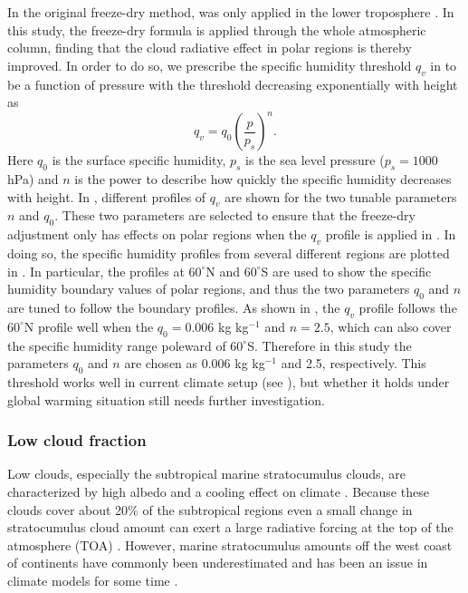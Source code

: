 In the original freeze-dry method,  was only applied in the lower troposphere \citep{Vavrus2008}. In this study, the freeze-dry formula is applied through the whole atmospheric column, finding that the cloud radiative effect in polar regions is thereby improved. In order to do so, we prescribe the specific humidity threshold $q_v$ in  to be a function of pressure with the threshold decreasing exponentially with height as
\begin{equation}
	q_{v} = q_0\left(\frac{p}{p_s}\right)^n.
	\label{eq:qv_freeze-dry}
\end{equation}
Here $q_0$ is the surface specific humidity, $p_s$ is the sea level pressure ($p_s=1000$ hPa) and $n$ is the power to describe how quickly the specific humidity decreases with height. In , different profiles of $q_v$ are shown for the two tunable parameters $n$ and $q_0$. These two parameters are selected to ensure that the freeze-dry adjustment only has effects on polar regions when the $q_v$ profile is applied in . In doing so, the specific humidity profiles from several different regions are plotted in . In particular, the profiles at $60^{\circ}$N and $60^{\circ}$S are used to show the specific humidity boundary values of polar regions, and thus the two parameters $q_0$ and $n$ are tuned to follow the boundary profiles. As shown in , the $q_v$ profile follows the $60^{\circ}$N profile well when the $q_0=0.006$ kg kg$^{-1}$ and $n=2.5$, which can also cover the specific humidity range poleward of $60^{\circ}$S. Therefore in this study the parameters $q_0$ and $n$ are chosen as 0.006 kg kg$^{-1}$ and 2.5, respectively. This threshold works well in current climate setup (see ), but whether it holds under global warming situation still needs further investigation.


\subsubsection{Low cloud fraction}

Low clouds, especially the subtropical marine stratocumulus clouds, are characterized by high albedo and a cooling effect on climate \citep{Hartmann2016}. Because these clouds cover about 20\% of the subtropical regions even a small change in stratocumulus cloud amount can exert a large radiative forcing at the top of the atmosphere (TOA) \citep{Slingo1990}. However, marine stratocumulus amounts off the west coast of continents have commonly been underestimated and has been an issue in climate models for some time \citep[e.g.,][]{Nam2012, Lauer2013, Dolinar2015}.

